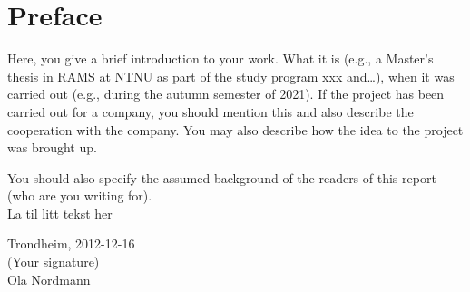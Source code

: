 \section*{Preface}
Here, you give a brief introduction to your work. What it is (e.g., a Master's thesis in RAMS at NTNU as part of the study program xxx and\ldots), when it was carried out (e.g., during the autumn semester of 2021). If the project has been carried out for a company, you should mention this and also describe the cooperation with the company. You may also describe how the idea to the project was brought up.

You should also specify the assumed background of the readers of this report (who are you writing for).\\[2cm]


La til litt tekst her


\DIFaddbegin {}\DIFaddend \begin{center}
Trondheim, 2012-12-16\\[1pc]
(Your signature)\\[1pc]
Ola Nordmann
\end{center}
